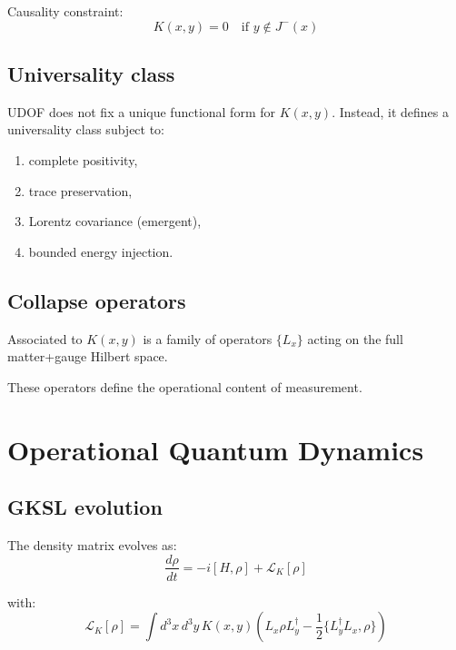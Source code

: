 \documentclass[11pt]{book}
\begin{document}
Causality constraint:
\begin{equation}
K(x,y) = 0 \quad \text{if } y \notin J^{-}(x)
\end{equation}

\section{Universality class}

UDOF does not fix a unique functional form for $K(x,y)$.
Instead, it defines a universality class subject to:

\begin{enumerate}[label=(K\arabic*)]
\item complete positivity,
\item trace preservation,
\item Lorentz covariance (emergent),
\item bounded energy injection.
\end{enumerate}

\section{Collapse operators}

Associated to $K(x,y)$ is a family of operators $\{L_x\}$ acting on the
full matter+gauge Hilbert space.

These operators define the operational content of measurement.

\chapter{Operational Quantum Dynamics}

\section{GKSL evolution}

The density matrix evolves as:
\begin{equation}
\frac{d\rho}{dt}
= -i[H,\rho] + \mathcal{L}_K[\rho]
\end{equation}

with:
\begin{equation}
\mathcal{L}_K[\rho]
=
\int d^3x\,d^3y\,
K(x,y)\left(
L_x \rho L_y^\dagger
-\frac{1}{2}\{L_y^\dagger L_x,\rho\}
\right)
\end{equation}
\end{document}
